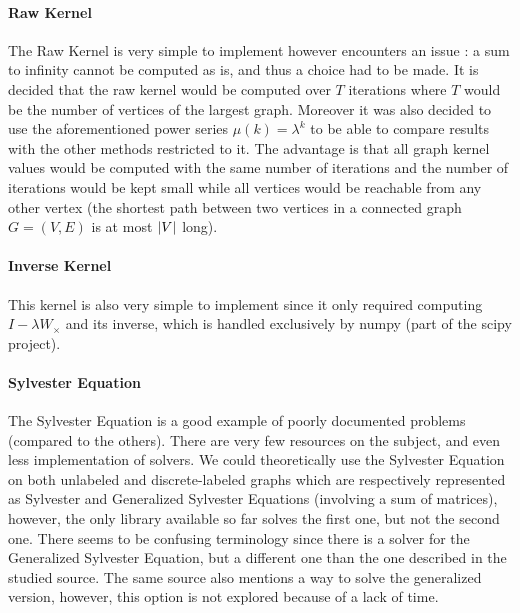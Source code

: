 \documentclass{article}
\DeclarePairedDelimiter{\abs}{\lvert}{\rvert}
\theoremstyle{definition}
\begin{document}
\paragraph{Raw Kernel}
The Raw Kernel is very simple to implement however encounters an issue : a sum to infinity cannot be computed as is, and thus a choice had to be made. It is decided that the raw kernel would be computed over $T$ iterations where $T$ would be the number of vertices of the largest graph. Moreover it was also decided to use the aforementioned power series $\mu(k)=\lambda^k$ to be able to compare results with the other methods restricted to it. The advantage is that all graph kernel values would be computed with the same number of iterations and the number of iterations would be kept small while all vertices would be reachable from any other vertex (the shortest path between two vertices in a connected graph $G=(V,E)$ is at most $\abs{V}$ long).  
\paragraph{Inverse Kernel}
This kernel is also very simple to implement  since it only required computing $I-\lambda W_{\times}$ and its inverse, which is handled exclusively by numpy (part of the scipy project).
\paragraph{Sylvester Equation}
The Sylvester Equation is a good example of poorly documented problems (compared to the others). There are very few resources on the subject, and even less implementation of solvers. We could theoretically use the Sylvester Equation on both unlabeled and discrete-labeled graphs which are respectively represented as Sylvester and Generalized Sylvester Equations (involving a sum of matrices), however, the only library available so far solves the first one, but not the second one. There seems to be confusing terminology since there is a solver for the Generalized Sylvester Equation, but a different one than the one described in the studied source\cite{vishwanathan_graph_2010}. The same source also mentions a way to solve the generalized version\cite{lathauwer2004}, however, this option is not explored because of a lack of time.  
\end{document}
